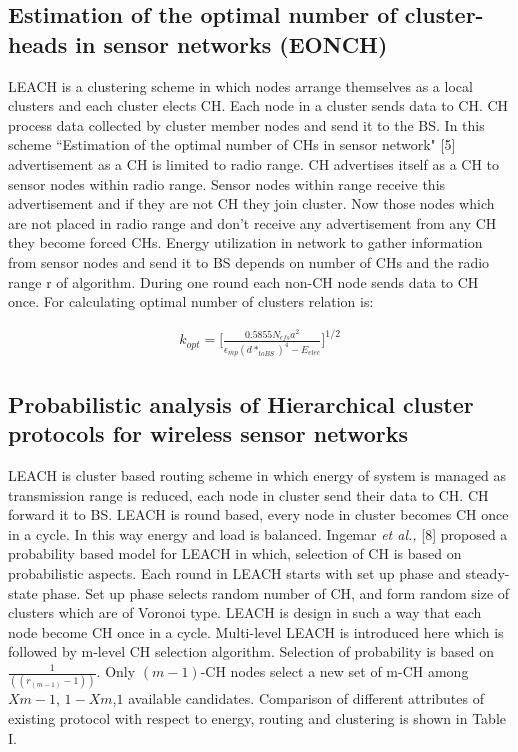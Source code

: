 \documentclass[10pt, conference, compsocconf]{IEEEtran}
\begin{document}
\subsection{Estimation of the optimal number of cluster-heads in sensor networks (EONCH)}
LEACH is a clustering scheme in which nodes arrange themselves as a local clusters and each cluster elects CH. Each node in a cluster sends data to CH.  CH process data collected by cluster member nodes and send it to the BS. In this scheme ``Estimation of the optimal number of CHs in sensor network" [5] advertisement as a CH is limited to radio range. CH advertises itself as a CH to sensor nodes within radio range. Sensor nodes within range receive this advertisement and if they are not CH they join  cluster. Now those nodes which are not placed in radio range and don't receive any advertisement from any CH they become forced CHs. Energy utilization in network to gather information from sensor nodes and send it to BS depends on number of CHs and the radio range r of algorithm. During one round each non-CH node sends data to CH once. For calculating optimal number of clusters relation is:

\begin{eqnarray}
k_{opt}= \Bigg[ \frac{0.5855 N_{\epsilon f s}a^{2}}{\epsilon_{mp}(d*_{toBS})^{4}-E_{elec}} \Bigg]^{1/2}
\end{eqnarray}

\subsection{Probabilistic analysis of Hierarchical cluster protocols for wireless sensor networks}
LEACH is cluster based routing scheme in which energy of  system is managed as transmission range is reduced, each node in cluster send their data to CH. CH forward it to BS. LEACH is round based, every node in cluster becomes CH once in a cycle. In this way energy and load is balanced. Ingemar \textit{et al.,} [8] proposed a probability based model for LEACH in which, selection of CH is based on probabilistic aspects. Each round in LEACH starts with set up phase and steady-state phase. Set up phase selects random number of CH, and form random size of clusters which are of Voronoi type. LEACH is design in such a way that each node become CH once in a cycle. Multi-level LEACH is introduced here which is followed by m-level CH selection algorithm. Selection of probability is based on $\frac{1}{((r_(m-1)-1) )}$. Only $(m - 1)$-CH nodes select a new set of m-CH among  $Xm-1$, $1 - Xm$,$1$ available candidates. Comparison of different attributes of existing protocol with respect to energy, routing and clustering is shown in Table I.
\end{document}
